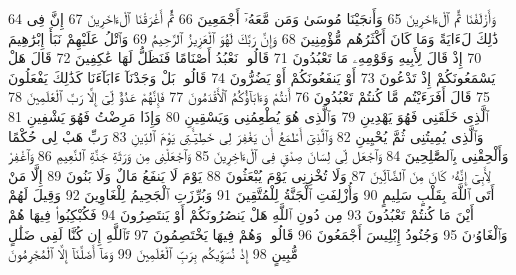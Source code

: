 {\tiny\colorbox{cl_aya}{64}} وَأَزْلَفْنَا ثَمَّ ٱلْءَاخَرِينَ
{\tiny\colorbox{cl_aya}{65}} وَأَنجَيْنَا مُوسَىٰ وَمَن مَّعَهُۥٓ أَجْمَعِينَ
{\tiny\colorbox{cl_aya}{66}} ثُمَّ أَغْرَقْنَا ٱلْءَاخَرِينَ
{\tiny\colorbox{cl_aya}{67}} إِنَّ فِى ذَٰلِكَ لَءَايَةً وَمَا كَانَ أَكْثَرُهُم مُّؤْمِنِينَ
{\tiny\colorbox{cl_aya}{68}} وَإِنَّ رَبَّكَ لَهُوَ ٱلْعَزِيزُ ٱلرَّحِيمُ
{\tiny\colorbox{cl_aya}{69}} وَٱتْلُ عَلَيْهِمْ نَبَأَ إِبْرَٰهِيمَ
{\tiny\colorbox{cl_aya}{70}} إِذْ قَالَ لِأَبِيهِ وَقَوْمِهِۦ مَا تَعْبُدُونَ
{\tiny\colorbox{cl_aya}{71}} قَالُوا۟ نَعْبُدُ أَصْنَامًا فَنَظَلُّ لَهَا عَٰكِفِينَ
{\tiny\colorbox{cl_aya}{72}} قَالَ هَلْ يَسْمَعُونَكُمْ إِذْ تَدْعُونَ
{\tiny\colorbox{cl_aya}{73}} أَوْ يَنفَعُونَكُمْ أَوْ يَضُرُّونَ
{\tiny\colorbox{cl_aya}{74}} قَالُوا۟ بَلْ وَجَدْنَآ ءَابَآءَنَا كَذَٰلِكَ يَفْعَلُونَ
{\tiny\colorbox{cl_aya}{75}} قَالَ أَفَرَءَيْتُم مَّا كُنتُمْ تَعْبُدُونَ
{\tiny\colorbox{cl_aya}{76}} أَنتُمْ وَءَابَآؤُكُمُ ٱلْأَقْدَمُونَ
{\tiny\colorbox{cl_aya}{77}} فَإِنَّهُمْ عَدُوٌّ لِّىٓ إِلَّا رَبَّ ٱلْعَٰلَمِينَ
{\tiny\colorbox{cl_aya}{78}} ٱلَّذِى خَلَقَنِى فَهُوَ يَهْدِينِ
{\tiny\colorbox{cl_aya}{79}} وَٱلَّذِى هُوَ يُطْعِمُنِى وَيَسْقِينِ
{\tiny\colorbox{cl_aya}{80}} وَإِذَا مَرِضْتُ فَهُوَ يَشْفِينِ
{\tiny\colorbox{cl_aya}{81}} وَٱلَّذِى يُمِيتُنِى ثُمَّ يُحْيِينِ
{\tiny\colorbox{cl_aya}{82}} وَٱلَّذِىٓ أَطْمَعُ أَن يَغْفِرَ لِى خَطِيٓـَٔتِى يَوْمَ ٱلدِّينِ
{\tiny\colorbox{cl_aya}{83}} رَبِّ هَبْ لِى حُكْمًا وَأَلْحِقْنِى بِٱلصَّٰلِحِينَ
{\tiny\colorbox{cl_aya}{84}} وَٱجْعَل لِّى لِسَانَ صِدْقٍ فِى ٱلْءَاخِرِينَ
{\tiny\colorbox{cl_aya}{85}} وَٱجْعَلْنِى مِن وَرَثَةِ جَنَّةِ ٱلنَّعِيمِ
{\tiny\colorbox{cl_aya}{86}} وَٱغْفِرْ لِأَبِىٓ إِنَّهُۥ كَانَ مِنَ ٱلضَّآلِّينَ
{\tiny\colorbox{cl_aya}{87}} وَلَا تُخْزِنِى يَوْمَ يُبْعَثُونَ
{\tiny\colorbox{cl_aya}{88}} يَوْمَ لَا يَنفَعُ مَالٌ وَلَا بَنُونَ
{\tiny\colorbox{cl_aya}{89}} إِلَّا مَنْ أَتَى ٱللَّهَ بِقَلْبٍ سَلِيمٍ
{\tiny\colorbox{cl_aya}{90}} وَأُزْلِفَتِ ٱلْجَنَّةُ لِلْمُتَّقِينَ
{\tiny\colorbox{cl_aya}{91}} وَبُرِّزَتِ ٱلْجَحِيمُ لِلْغَاوِينَ
{\tiny\colorbox{cl_aya}{92}} وَقِيلَ لَهُمْ أَيْنَ مَا كُنتُمْ تَعْبُدُونَ
{\tiny\colorbox{cl_aya}{93}} مِن دُونِ ٱللَّهِ هَلْ يَنصُرُونَكُمْ أَوْ يَنتَصِرُونَ
{\tiny\colorbox{cl_aya}{94}} فَكُبْكِبُوا۟ فِيهَا هُمْ وَٱلْغَاوُۥنَ
{\tiny\colorbox{cl_aya}{95}} وَجُنُودُ إِبْلِيسَ أَجْمَعُونَ
{\tiny\colorbox{cl_aya}{96}} قَالُوا۟ وَهُمْ فِيهَا يَخْتَصِمُونَ
{\tiny\colorbox{cl_aya}{97}} تَٱللَّهِ إِن كُنَّا لَفِى ضَلَٰلٍ مُّبِينٍ
{\tiny\colorbox{cl_aya}{98}} إِذْ نُسَوِّيكُم بِرَبِّ ٱلْعَٰلَمِينَ
{\tiny\colorbox{cl_aya}{99}} وَمَآ أَضَلَّنَآ إِلَّا ٱلْمُجْرِمُونَ
